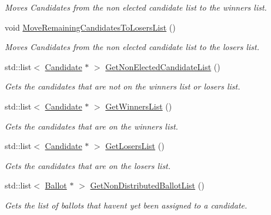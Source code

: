 \begin{DoxyCompactItemize}
\begin{DoxyCompactList}\small\item\em Moves Candidates from the non elected candidate list to the winners list. \end{DoxyCompactList}\item 
\mbox{\label{classPluralityElectionRecord_aed6bc13b7af6b3747f0bfde6d19d47b4}} 
void \hyperlink{classPluralityElectionRecord_aed6bc13b7af6b3747f0bfde6d19d47b4}{Move\+Remaining\+Candidates\+To\+Losers\+List} ()
\begin{DoxyCompactList}\small\item\em Moves Candidates from the non elected candidate list to the losers list. \end{DoxyCompactList}\item 
std\+::list$<$ \hyperlink{classCandidate}{Candidate} $\ast$ $>$ \hyperlink{classPluralityElectionRecord_a3767192b33477411922f21ef4474f2e5}{Get\+Non\+Elected\+Candidate\+List} ()
\begin{DoxyCompactList}\small\item\em Gets the candidates that are not on the winners list or losers list. \end{DoxyCompactList}\item 
std\+::list$<$ \hyperlink{classCandidate}{Candidate} $\ast$ $>$ \hyperlink{classPluralityElectionRecord_a5b5da69173023ac0441918b0485b58b9}{Get\+Winners\+List} ()
\begin{DoxyCompactList}\small\item\em Gets the candidates that are on the winners list. \end{DoxyCompactList}\item 
std\+::list$<$ \hyperlink{classCandidate}{Candidate} $\ast$ $>$ \hyperlink{classPluralityElectionRecord_af998fcfa909f9e781ab5c48bd6b54d77}{Get\+Losers\+List} ()
\begin{DoxyCompactList}\small\item\em Gets the candidates that are on the losers list. \end{DoxyCompactList}\item 
std\+::list$<$ \hyperlink{classBallot}{Ballot} $\ast$ $>$ \hyperlink{classPluralityElectionRecord_a996f0e14812b0b1d510af52ab0c496bf}{Get\+Non\+Distributed\+Ballot\+List} ()
\begin{DoxyCompactList}\small\item\em Gets the list of ballots that haven\textquotesingle{}t yet been assigned to a candidate. \end{DoxyCompactList}\end{DoxyCompactItemize}
